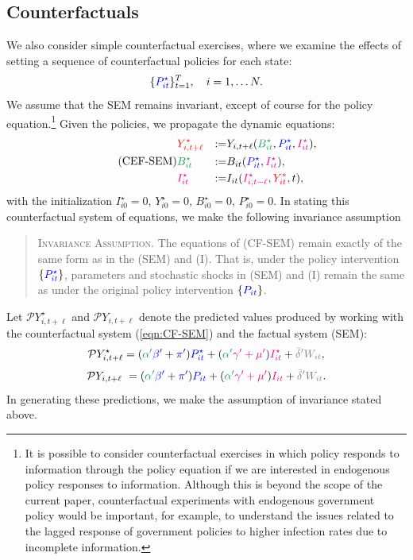 \documentclass[11pt,reqno,letter]{amsart}
\theoremstyle{definition}
\def\bcolor{\color{ForestGreen}}
\def\pcolor{\color{blue}}
\def\icolor{\color{magenta}}
\def\wcolor{\color{gray}}
\def\ycolor{\color{red}}
\begin{document}
\subsection{Counterfactuals}

We  also consider simple counterfactual exercises, where we examine the effects of setting
a sequence of counterfactual policies for each state:
$$
\{{\pcolor P^\star_{it}} \}_{t=1}^T, \quad i=1, \ldots N.
$$
We assume that the SEM remains invariant, except of course for the policy equation.\footnote{It is possible to consider counterfactual exercises in which policy  responds to information through the policy equation if we are interested in endogenous policy responses to information. Although this is beyond the scope of the current paper, counterfactual experiments with endogenous government policy would be important, for example, to understand the issues related to the lagged response of government policies to higher infection rates due to incomplete information. } Given the policies,
we propagate the dynamic equations:
\begin{equation} \label{eqn:CF-SEM} \tag{CEF-SEM}
  \begin{aligned}
& {\ycolor Y^\star_{i,t+\ell}}  & := & Y_{i,t+\ell} ( {\bcolor B^\star_{it} } , {\pcolor P^\star_{it}}, {\icolor I^\star_{it}}), \\
& {\bcolor B^\star_{it} } & := &   B_{it}({\pcolor P^\star_{it} } ,{\icolor I^\star_{it}}), \\
& {\icolor I^\star_{it} }& := &  I_{it}({\icolor I^\star_{i,t-\ell}}, {\ycolor Y^*_{it}}, t),  \end{aligned}
\end{equation}
with the initialization $I^\star_{i0} = 0$, $ Y^\star_{i0} =0$, $B^\star_{i0} = 0$, $P^\star_{i0} = 0$.
In stating this counterfactual system of equations, we make the following invariance assumption
\begin{quote}
\textsc{Invariance Assumption.} The equations of (CF-SEM) remain exactly of the same form
as in the (SEM) and (I). That is, under the policy intervention $\{{\pcolor P^\star_{it}} \}$,  parameters and stochastic shocks in (SEM) and (I) remain the same as under the original policy intervention $\{{\pcolor P_{it}} \}$.
\end{quote}


Let $\mathcal{P} Y^\star_{i,t+\ell}$  and  $\mathcal{P} Y_{i,t+\ell}$ denote the predicted values produced
by working with the counterfactual system (\ref{eqn:CF-SEM}) and the factual system (SEM):
$$
\mathcal{P} Y^\star_{i,t+\ell}  = ( {\bcolor\alpha '} {\pcolor \beta'}  + {\pcolor\pi'})
    {\pcolor P^\star_{it}} + ({\bcolor\alpha '}  {\icolor \gamma' + \mu'})
    {\icolor I^\star_{it} }+ {\wcolor \bar \delta 'W_{it}},$$$$\mathcal{P} Y_{i,t+\ell} \ =
    ( {\bcolor\alpha '}  {\pcolor \beta'} + {\pcolor\pi'})
    {\pcolor P_{it}} + ({\bcolor\alpha '}  {\icolor \gamma' + \mu'})
    {\icolor I_{it} }+ {\wcolor \bar \delta 'W_{it}}.
$$
In generating these predictions, we make the assumption of invariance stated above.
\end{document}
